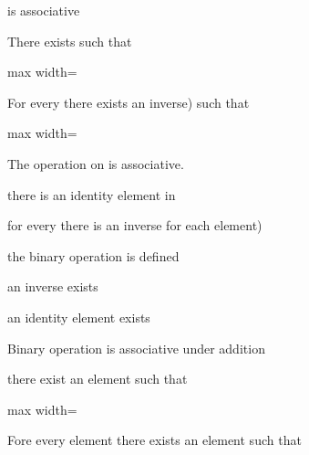 \documentclass[11pt,oneside]{article}
\begin{document}
\begin{BookBody}

\BookInline{\ast } is associative

There exists  such that

\begin{center}\begin{adjustbox}{max width=\linewidth}\end{adjustbox}\end{center}

For every  there exists an inverse) such that

\begin{center}\begin{adjustbox}{max width=\linewidth}\end{adjustbox}\end{center}


The operation on  is associative.

there is an identity element  in 

for every  there is an inverse for each element)


the binary operation is defined

an inverse exists

an identity element exists


Binary operation \BookInline{\ast } is associative under addition

there exist an element  such that

\begin{center}\begin{adjustbox}{max width=\linewidth}\end{adjustbox}\end{center}

Fore every element  there exists an element  such that


\end{BookBody}
\end{document}
